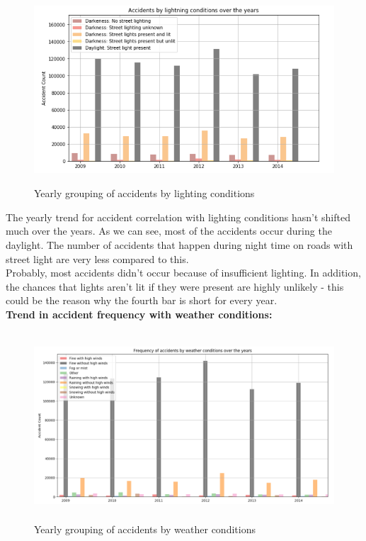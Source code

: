 \documentclass[a4paper, 10pt]{article}
\begin{document}
\begin{figure}   [H]
   \begin{center}
   \caption{Yearly grouping of accidents by lighting conditions}
     \includegraphics[width=70cm,height=7cm, scale=0.2,keepaspectratio]{lighting-study.png}
   \end{center}
\end{figure}

   The yearly trend for accident correlation with lighting conditions hasn't shifted much over the years. As we can see, most of the accidents occur during the daylight. The number of accidents that happen during night time on roads with street light are very less compared to this. \\
   Probably, most accidents didn't occur because of insufficient lighting. In addition, the chances that lights aren't lit if they were present are highly unlikely - this could be the reason why the fourth bar is short for every year. \\

   \textbf{Trend in accident frequency with weather conditions:}
\begin{figure}[H]
   \begin{center}
   \caption{Yearly grouping of accidents by weather conditions}
     \includegraphics[width=70cm,height=7cm, scale=0.2,keepaspectratio]{weather-study.png}
   \end{center}
\end{figure}
\end{document}
